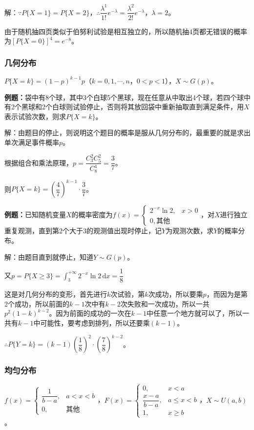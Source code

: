 \documentclass[UTF8, 12pt]{ctexart}
\begin{document}
解：$\because P\{X=1\}=P\{X=2\}$，$\therefore\dfrac{\lambda^1}{1!}e^{-\lambda}=\dfrac{\lambda^2}{2!}e^{-\lambda}$，$\lambda=2$。

由于随机抽四页类似于伯努利试验是相互独立的，所以随机抽4页都无错误的概率为$[P\{X=0\}]^4=e^{-8}$。

\subsubsection{几何分布}

$P\{X=k\}=(1-p)^{k-1}p$（$k=0,1,\cdots,n$，$0<p<1$），$X\sim G(p)$。

\textbf{例题：}袋中有8个球，其中3个白球5个黑球，现在任意从中取出4个球，若四个球中有2个黑球和2个白球则试验停止，否则将其放回袋中重新抽取直到满足条件，用$X$表示试验次数，则求$P\{X=k\}$。

解：由题目的停止，则说明这个题目的概率是服从几何分布的，最重要的就是求出单次满足事件概率$p$。

根据组合和乘法原理，$p=\dfrac{C_3^2C_5^2}{C_8^4}=\dfrac{3}{7}$。

则$P\{X=k\}=\left(\dfrac{4}{7}\right)^{k-1}\cdot\dfrac{3}{7}$。

\textbf{例题：}已知随机变量$X$的概率密度为$f(x)=\left\{\begin{array}{ll}
    2^{-x}\ln2, & x>0 \\
    0, \text{其他}
\end{array}\right.$，对$X$进行独立重复观测，直到第2个大于3的观测值出现时停止，记$Y$为观测次数，求$Y$的概率分布。

解：由题目直到就停止，知道$Y\sim G(p)$。

又$p=P\{X\geqslant3\}=\int_3^{+\infty}2^{-x}\ln2\,\textrm{d}x=\dfrac{1}{8}$

这是对几何分布的变形，首先进行$k$次试验，第$k$次成功，所以要乘$p$，而因为是第2个成功，所以前面的$k-1$次中有$k-2$次失败和一次成功，所以一共$p^2(1-k)^{k-2}$。因为前面的成功的一次在$k-1$中任意一个地方就可以了，所以一共有$k-1$中可能性，要考虑到排列，所以还要乘$(k-1)$。

$\therefore P\{Y=k\}=(k-1)\left(\dfrac{1}{8}\right)^2\cdot\left(\dfrac{7}{8}\right)^{k-2}$。

\subsubsection{均匀分布}

$f(x)=\left\{\begin{array}{ll}
    \dfrac{1}{b-a}, & a<x<b \\
    0, & \text{其他}
\end{array}\right.$，$F(x)=\left\{\begin{array}{ll}
    0, & x<a \\
    \dfrac{x-a}{b-a}, & a\leqslant x<b \\
    1, & x\geqslant b
\end{array}\right.$，$X\sim U(a,b)$。
\end{document}
